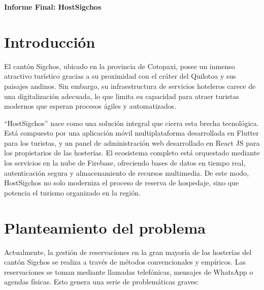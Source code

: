 \documentclass{article}
\begin{document}
\vspace{-2cm}
\begin{minipage}[t]{0.6\textwidth}
  \raggedright
  \textbf{\LARGE Informe Final: HostSigchos }
\end{minipage}
\begin{minipage}[ht]{0.2\textwidth}
  \raggedleft
\end{minipage}\vspace{-1cm}

\pagestyle{fancy}
\fancyhf{}
\fancyfoot[C]{\thepage}
\renewcommand{\headrulewidth}{0.4pt}

\tableofcontents
\newpage

\section{Introducción}
El cantón Sigchos, ubicado en la provincia de Cotopaxi, posee un inmenso atractivo turístico gracias a su proximidad con el cráter del Quilotoa y sus paisajes andinos. Sin embargo, su infraestructura de servicios hoteleros carece de una digitalización adecuada, lo que limita su capacidad para atraer turistas modernos que esperan procesos ágiles y automatizados. 

``HostSigchos'' nace como una solución integral que cierra esta brecha tecnológica. Está compuesto por una aplicación móvil multiplataforma desarrollada en Flutter para los turistas, y un panel de administración web desarrollado en React JS para los propietarios de las hosterías. El ecosistema completo está orquestado mediante los servicios en la nube de Firebase, ofreciendo bases de datos en tiempo real, autenticación segura y almacenamiento de recursos multimedia. De este modo, HostSigchos no solo moderniza el proceso de reserva de hospedaje, sino que potencia el turismo organizado en la región.

\section{Planteamiento del problema}
Actualmente, la gestión de reservaciones en la gran mayoría de las hosterías del cantón Sigchos se realiza a través de métodos convencionales y empíricos. Las reservaciones se toman mediante llamadas telefónicas, mensajes de WhatsApp o agendas físicas. Esto genera una serie de problemáticas graves:
\end{document}
